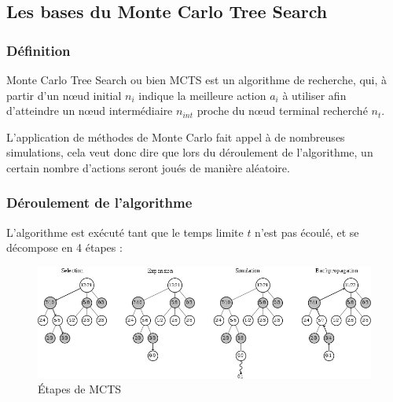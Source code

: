 \documentclass[pdftex,french, english]{article}	%
\begin{document}
	\subsection{Les bases du Monte Carlo Tree Search}
	\subsubsection{Définition}
	Monte Carlo Tree Search ou bien MCTS est un algorithme de recherche, qui, à partir d'un nœud initial $n_{i}$ indique la meilleure action $a_i$ à utiliser afin d'atteindre un nœud intermédiaire $n_{int}$ proche du nœud terminal recherché $n_{t}$. 

	L'application de méthodes de Monte Carlo fait appel à de nombreuses simulations, cela veut donc dire que lors du déroulement de l'algorithme, un certain nombre d'actions seront joués de manière aléatoire.
	\subsubsection{Déroulement de l'algorithme}
	L'algorithme est exécuté tant que le temps limite $t$ n'est pas écoulé, et se décompose en 4 étapes :
	\begin{figure}[h]
		\centering
		\includegraphics[width=\textwidth]{etapes.png}
		\caption{ Étapes de MCTS}
		 \label{fig:mcts}
	\end{figure}
\end{document}
